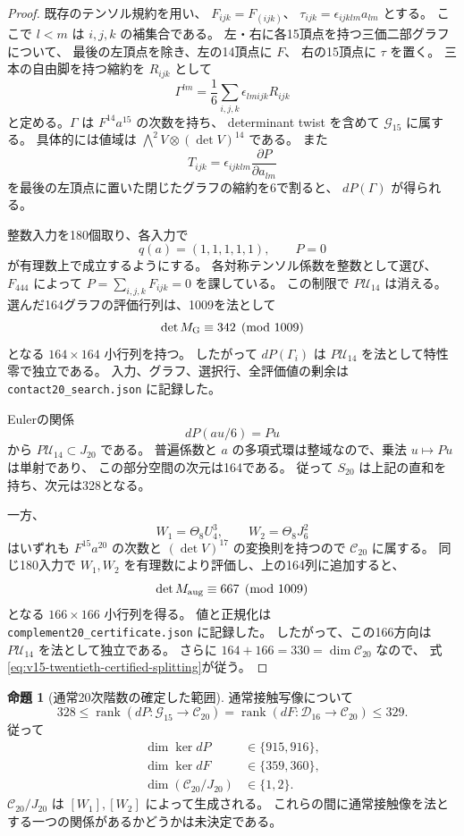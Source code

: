 \documentclass[a4paper,11pt]{ltjsarticle}
\theoremstyle{definition}
\newtheorem{proposition}[theorem]{命題}
\begin{document}
\begin{proof}
既存のテンソル規約を用い、
$F_{ijk}=F_{(ijk)}$、
$\tau_{ijk}=\epsilon_{ijklm}a_{lm}$ とする。
ここで $l<m$ は $i,j,k$ の補集合である。
左・右に各15頂点を持つ三価二部グラフについて、
最後の左頂点を除き、左の14頂点に $F$、
右の15頂点に $\tau$ を置く。
三本の自由脚を持つ縮約を $R_{ijk}$ として
\[
 \Gamma^{lm}=\frac16\sum_{i,j,k}\epsilon_{lmijk}R_{ijk}
\]
と定める。$\Gamma$ は $F^{14}a^{15}$ の次数を持ち、
determinant twist を含めて $\mathcal G_{15}$ に属する。
具体的には値域は $\bigwedge^2V\otimes(\det V)^{14}$ である。
また
\[
 T_{ijk}=\epsilon_{ijklm}\frac{\partial P}{\partial a_{lm}}
\]
を最後の左頂点に置いた閉じたグラフの縮約を6で割ると、
$dP(\Gamma)$ が得られる。

整数入力を180個取り、各入力で
\[
              q(a)=(1,1,1,1,1),\qquad P=0
\]
が有理数上で成立するようにする。
各対称テンソル係数を整数として選び、
$F_{444}$ によって $P=\sum_{i,j,k}F_{ijk}=0$ を課している。
この制限で $P\mathcal U_{14}$ は消える。
選んだ164グラフの評価行列は、1009を法として
\[
                  \det M_{\rm G}\equiv342\pmod{1009}
\]
となる $164\times164$ 小行列を持つ。
したがって $dP(\Gamma_i)$ は $P\mathcal U_{14}$ を法として特性零で独立である。
入力、グラフ、選択行、全評価値の剰余は
\texttt{contact20\_search.json} に記録した。

Eulerの関係
\[
                         dP(au/6)=Pu
\]
から $P\mathcal U_{14}\subset J_{20}$ である。
普遍係数と $a$ の多項式環は整域なので、乗法 $u\mapsto Pu$ は単射であり、
この部分空間の次元は164である。
従って $S_{20}$ は上記の直和を持ち、次元は328となる。

一方、
\[
             W_1=\Theta_8U_4^3,\qquad W_2=\Theta_8J_6^2
\]
はいずれも $F^{15}a^{20}$ の次数と $(\det V)^{17}$ の変換則を持つので
$\mathcal C_{20}$ に属する。
同じ180入力で $W_1,W_2$ を有理数により評価し、上の164列に追加すると、
\[
                  \det M_{\rm aug}\equiv667\pmod{1009}
\]
となる $166\times166$ 小行列を得る。
値と正規化は \texttt{complement20\_certificate.json} に記録した。
したがって、この166方向は $P\mathcal U_{14}$ を法として独立である。
さらに $164+166=330=\dim\mathcal C_{20}$ なので、
式\eqref{eq:v15-twentieth-certified-splitting}が従う。
\end{proof}

\begin{proposition}[通常20次階数の確定した範囲]
\label{prop:v15-twentieth-contact-rank-bounds}
通常接触写像について
\[
 328\le
 \operatorname{rank}(dP:\mathcal G_{15}\to\mathcal C_{20})
 =
 \operatorname{rank}(dF:\mathcal D_{16}\to\mathcal C_{20})
 \le329.
\]
従って
\[
 \begin{split}
 \dim\ker dP&\in\{915,916\},\\
 \dim\ker dF&\in\{359,360\},\\
 \dim(\mathcal C_{20}/J_{20})&\in\{1,2\}.
 \end{split}
\]
$\mathcal C_{20}/J_{20}$ は $[W_1],[W_2]$ によって生成される。
これらの間に通常接触像を法とする一つの関係があるかどうかは未決定である。
\end{proposition}
\end{document}
